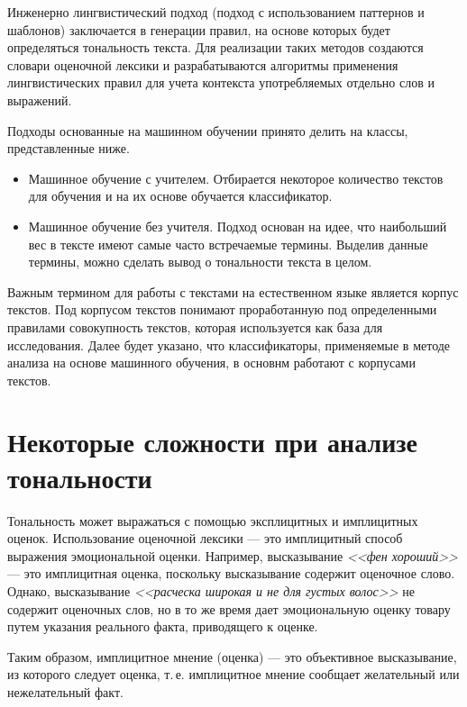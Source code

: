 Инженерно лингвистический подход (подход с использованием паттернов и шаблонов) заключается в генерации правил, на основе которых будет определяться тональность текста. Для реализации таких методов создаются словари оценочной лексики и разрабатываются алгоритмы применения лингвистических правил для учета контекста употребляемых отдельно слов и выражений.

Подходы основанные на машинном обучении принято делить на классы, представленные ниже. 
\begin{itemize}
	\item Машинное обучение с учителем. Отбирается некоторое количество текстов для обучения и на их основе обучается классификатор.
	\item Машинное обучение без учителя. Подход основан на идее, что наибольший вес в тексте имеют самые часто встречаемые термины.\cite{ml-uns} Выделив данные термины, можно сделать вывод о тональности текста в целом.
\end{itemize}


Важным термином для работы с текстами на естественном языке является корпус текстов. Под корпусом текстов понимают проработанную под определенными правилами совокупность текстов, которая используется как база для исследования. Далее будет указано, что классификаторы, применяемые в методе анализа на основе машинного обучения, в основнм работают с корпусами текстов. 

\section{Некоторые сложности при анализе \\ тональности}

Тональность может выражаться с помощью эксплицитных и имплицитных оценок. Использование оценочной лексики --- это имплицитный способ выражения эмоциональной оценки. Например, высказывание \textit{<<фен хороший>>} --- это имплицитная оценка, поскольку высказывание содержит оценочное слово. Однако, высказывание \textit{<<расческа широкая и не для густых волос>>} не содержит оценочных слов, но в то же время дает эмоциональную оценку товару путем указания реального факта, приводящего к оценке.

Таким образом, имплицитное мнение (оценка)\cite{mining} --- это объективное высказывание, из которого следует оценка, т.\,е. имплицитное мнение сообщает желательный или нежелательный факт.


